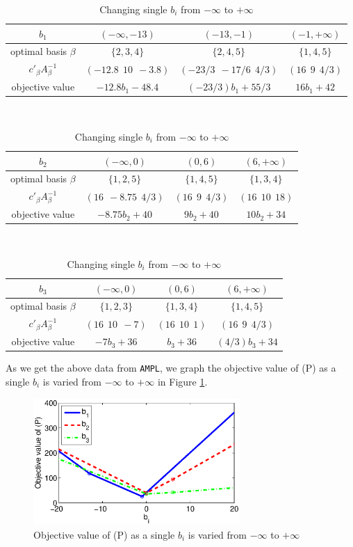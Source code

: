 \begin{table}[!h]
\centering
\small
\begin{tabular}{|c|c|c|c|}\hline

$b_1$ & $(-\infty, -13)$ & $(-13, -1)$ & $(-1,+\infty)$ \\\hline
optimal basis $\beta$ & $\{2,3,4\}$ & $\{2,4,5\}$ & $\{1,4,5\}$ \\\hline
$c'_{\beta}A^{-1}_{\beta}$ & $(-12.8~~10~~-3.8)$ & $(-23/3~~-17/6~~4/3)$ & $(16~~9~~4/3)$ \\\hline
objective value & $-12.8b_1-48.4$& $(-23/3)b_1+55/3$ & $16b_1+42$ \\\hline 

\end{tabular}
\\
\begin{tabular}{|c|c|c|c|}\hline

$b_2$ & $(-\infty, 0)$ & $(0, 6)$ & $(6,+\infty)$ \\\hline
optimal basis $\beta$ & $\{1,2,5\}$ & $\{1,4,5\}$ & $\{1,3,4\}$ \\\hline
$c'_{\beta}A^{-1}_{\beta}$ & $(16~~-8.75~~4/3)$ & $(16~~9~~4/3)$ & $(16~~10~~18)$ \\\hline
objective value & $-8.75b_2+40$& $9b_2+40$ & $10b_2+34$ \\\hline 

\end{tabular}
\\
\begin{tabular}{|c|c|c|c|}\hline

$b_3$ & $(-\infty, 0)$ & $(0, 6)$ & $(6,+\infty)$ \\\hline
optimal basis $\beta$ & $\{1,2,3\}$ & $\{1,3,4\}$ & $\{1,4,5\}$ \\\hline
$c'_{\beta}A^{-1}_{\beta}$ & $(16~~10~~-7)$ & $(16~~10~~1)$ & $(16~~9~~4/3)$ \\\hline
objective value & $-7b_3+36$& $b_3+36$ & $(4/3)b_3+34$ \\\hline 

\end{tabular}
\caption{Changing single $b_i$ from $-\infty$ to $+\infty$}
\label{tab:p2}
\end{table}

As we get the above data from {\tt AMPL}, we graph the objective value of (P) as a single $b_i$ is varied from $-\infty$ to $+\infty$ in Figure \ref{fig:p2}.

\begin{figure}[h!!]
\includegraphics[width=0.7\textwidth]{p2/p2.eps}
\caption{Objective value of (P) as a single $b_i$ is varied from $-\infty$ to $+\infty$}\label{fig:p2}
\end{figure}
